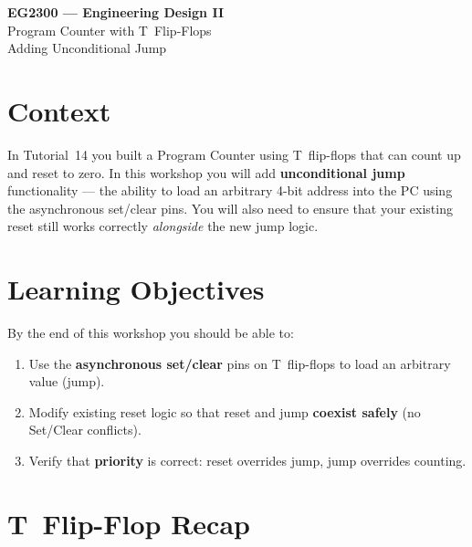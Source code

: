 \documentclass[11pt,a4paper]{article}
\begin{document}
\begin{center}
  {\LARGE\bfseries EG2300 --- Engineering Design II}\\[6pt]
  {\Large Program Counter with T~Flip-Flops}\\[4pt]
  {\large Adding Unconditional Jump}
\end{center}
\vspace{1em}

\section{Context}

In Tutorial~14 you built a Program Counter using T~flip-flops that can
count up and reset to zero.
In this workshop you will add \textbf{unconditional jump} functionality
--- the ability to load an arbitrary 4-bit address into the PC using the
asynchronous set/clear pins.
You will also need to ensure that your existing reset still works correctly
\emph{alongside} the new jump logic.

\section{Learning Objectives}

By the end of this workshop you should be able to:
\begin{enumerate}[leftmargin=2em]
  \item Use the \textbf{asynchronous set/clear} pins on T~flip-flops to load an arbitrary value (jump).
  \item Modify existing reset logic so that reset and jump \textbf{coexist safely} (no Set/Clear conflicts).
  \item Verify that \textbf{priority} is correct: reset overrides jump, jump overrides counting.
\end{enumerate}

\section{T~Flip-Flop Recap}
\end{document}
